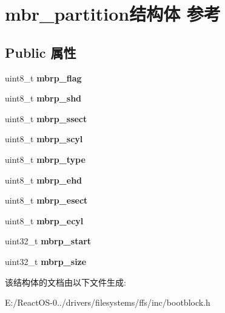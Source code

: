 \hypertarget{structmbr__partition}{}\section{mbr\+\_\+partition结构体 参考}
\label{structmbr__partition}
\subsection*{Public 属性}
\begin{DoxyCompactItemize}
\item 
\mbox{\label{structmbr__partition_abad41d06ba816a2c2235d865c410a23b}} 
uint8\+\_\+t {\bfseries mbrp\+\_\+flag}
\item 
\mbox{\label{structmbr__partition_a0758938eb8dadf7a42c42dd350f70b06}} 
uint8\+\_\+t {\bfseries mbrp\+\_\+shd}
\item 
\mbox{\label{structmbr__partition_aae8c6b90493054ec621e3b97f2a7d76c}} 
uint8\+\_\+t {\bfseries mbrp\+\_\+ssect}
\item 
\mbox{\label{structmbr__partition_a9f0e7cb492db311847b53cfe6cf64008}} 
uint8\+\_\+t {\bfseries mbrp\+\_\+scyl}
\item 
\mbox{\label{structmbr__partition_aa682a4edee33d87431dee7e7c168f7f3}} 
uint8\+\_\+t {\bfseries mbrp\+\_\+type}
\item 
\mbox{\label{structmbr__partition_ae2cf54ecd8b3899b1b71165aeee2c7f4}} 
uint8\+\_\+t {\bfseries mbrp\+\_\+ehd}
\item 
\mbox{\label{structmbr__partition_afa5abb8ffc0828e6d197438e061b96b6}} 
uint8\+\_\+t {\bfseries mbrp\+\_\+esect}
\item 
\mbox{\label{structmbr__partition_a4f002a62960d9d9772bb918e15188bb9}} 
uint8\+\_\+t {\bfseries mbrp\+\_\+ecyl}
\item 
\mbox{\label{structmbr__partition_a74a2ee25d3edc06e63c75a93b22db8c2}} 
uint32\+\_\+t {\bfseries mbrp\+\_\+start}
\item 
\mbox{\label{structmbr__partition_a8e318fb0c7ef560c3e213a56ac006e96}} 
uint32\+\_\+t {\bfseries mbrp\+\_\+size}
\end{DoxyCompactItemize}


该结构体的文档由以下文件生成\+:\begin{DoxyCompactItemize}
\item 
E\+:/\+React\+O\+S-\/0../drivers/filesystems/ffs/inc/bootblock.\+h\end{DoxyCompactItemize}
